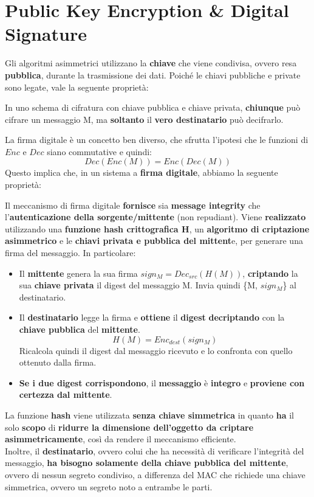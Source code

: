 \section{Public Key Encryption \& Digital Signature}
Gli algoritmi asimmetrici utilizzano la \textbf{chiave} che viene condivisa, ovvero resa \textbf{pubblica}, durante la trasmissione dei dati. Poiché le chiavi pubbliche e private sono legate, vale la seguente proprietà:
\begin{proposition}
In uno schema di cifratura con chiave pubblica e chiave privata, \textbf{chiunque} può cifrare un messaggio M, ma \textbf{soltanto} il \textbf{vero destinatario} può decifrarlo.
\end{proposition}
La firma digitale è un concetto ben diverso, che sfrutta l'ipotesi che le funzioni di $Enc$ e $Dec$ siano commutative e quindi:
\begin{equation}\label{eq:commut}
    Dec(Enc(M)) = Enc(Dec(M))
\end{equation}
Questo implica che, in un sistema a \textbf{firma digitale}, abbiamo la seguente proprietà:
\begin{proposition}
Il meccanismo di firma digitale \textbf{fornisce} sia\textbf{ message integrity} che l’\textbf{autenticazione della sorgente/mittente} (non repudiant). Viene \textbf{realizzato} utilizzando una \textbf{funzione hash crittografica H}, un \textbf{algoritmo di criptazione asimmetrico} e le \textbf{chiavi privata e pubblica del mittent}e, per generare una firma del messaggio. In particolare:
\begin{itemize}
    \item Il \textbf{mittente} genera la sua firma $sign_M=Dec_{src}(H(M))$, \textbf{criptando} la sua \textbf{chiave privata} il digest del messaggio M. Invia quindi \{M, $sign_M$\} al destinatario.
    \item Il \textbf{destinatario} legge la firma e \textbf{ottiene} il \textbf{digest} \textbf{decriptando} con la \textbf{chiave pubblica} del \textbf{mittente}.
    \[H(M)=Enc_{dest}(sign_M)\]
    Ricalcola quindi il digest dal messaggio ricevuto e lo confronta con quello ottenuto dalla firma.
    \item \textbf{Se i due digest corrispondono}, il \textbf{messaggio} è \textbf{integro} e \textbf{proviene con certezza dal mittente}.
\end{itemize}
\end{proposition}
\begin{remark}
La funzione \textbf{hash} viene utilizzata\textbf{ senza chiave simmetrica} in quanto \textbf{ha} il solo \textbf{scopo} di \textbf{ridurre la dimensione dell’oggetto da criptare asimmetricamente}, così da rendere il meccanismo efficiente.\\
Inoltre, il \textbf{destinatario}, ovvero colui che ha necessità di verificare l’integrità del messaggio, \textbf{ha bisogno solamente della chiave pubblica del mittente}, ovvero di nessun segreto condiviso, a differenza del MAC che richiede una chiave simmetrica, ovvero un segreto noto a entrambe le parti.
\end{remark}
